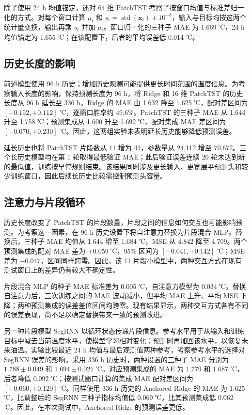 \documentclass[UTF8,a4paper,11pt,fontset=windows]{ctexart}
\begin{document}
除了使用 24 h 均值锚定，还对 64 维 PatchTST 考察了按窗口均值与标准差归一化的方式。对每个窗口计算 $\mu_t$ 和 $s_t=\operatorname{std}(\mathbf x_t)+10^{-8}$，输入与目标均按这两个统计量变换，输出再乘 $s_t$ 并加 $\mu_t$。窗口归一化的三种子 MAE 为 1.669 ℃，24 h 均值锚定为 1.655 ℃；在该配置下，后者的平均误差低 0.014 ℃。

\subsection{历史长度的影响}
前述模型使用 96 h 历史；增加历史观测可能提供更长时间范围的温度信息。为考察输入长度的影响，保持预测长度为 96 h，将 Ridge 和 16 维 PatchTST 的历史长度从 96 h 延长至 336 h。Ridge 的 MAE 由 1.632 降至 1.625 ℃，配对差区间为 $[-0.152,+0.112]$ ℃，逐窗口胜率约 49.6\%。PatchTST 的三种子 MAE 从 1.644 升至 1.758 ℃；预测集成从 1.600 升至 1.692 ℃，配对集成 MAE 差区间为 $[-0.070,+0.230]$ ℃。因此，这两组实验未表明延长历史能够降低预测误差。

延长历史也将 PatchTST 片段数从 11 增为 41，参数量从 24,112 增至 70,672。三个长历史模型均在第 1 轮取得最低验证 MAE；此后验证误差连续 20 轮未达到新的最低值，训练按早停规则结束。该结果同时涉及更长输入、更宽展平预测头和较少训练窗口，因此后续长历史比较需控制预测头容量。

\subsection{注意力与片段循环}
历史长度改变了 PatchTST 的片段数量，片段之间的信息如何交互也可能影响预测。为考察这一因素，在 96 h 历史设置下将自注意力替换为片段混合 MLP。替换后，三种子 MAE 均值从 1.644 增至 1.684 ℃，MSE 从 4.842 降至 4.709。两个预测集成的配对 MAE 差为 +0.059 ℃，95\% 区间为 $[-0.041,+0.142]$ ℃；MSE 差为 $-0.047$，区间同样跨零。因此，该 11 片段小模型中，两种交互方式在现有测试窗口上的差异仍有较大不确定性。

片段混合 MLP 的种子 MAE 标准差为 0.005 ℃，自注意力模型为 0.034 ℃。替换自注意力后，三次训练之间的 MAE 波动减小，但平均 MAE 上升、平均 MSE 下降；两种预测集成的误差差值区间均跨零。现有结果显示，两种交互方式各有不同的误差表现，尚不足以确定替换带来一致的预测改进。

另一种片段模型 SegRNN 以循环状态传递片段信息。参考水平用于从输入和训练目标中减去当前温度水平，使模型学习相对变化；预测时再加回该水平，以恢复未来油温。实验比较最近 24 h 均值与最后观测值两种参考，考察参考水平的选择对 SegRNN 误差的影响。采用 336 h 历史时，两种设置的三种子 MAE 分别为 $1.788\pm0.049$ 和 $1.694\pm0.021$ ℃。对应预测集成的 MAE 为 1.779 和 1.687 ℃，后者降低 0.092 ℃；按测试窗口计算的集成 MAE 配对差区间为 $[+0.060,+0.120]$ ℃。同样使用 336 h 历史的 Anchored Ridge 的 MAE 为 1.625 ℃，比调整后的 SegRNN 三种子指标均值低 0.069 ℃，比其预测集成低 0.062 ℃。因此，在本次测试中，Anchored Ridge 的预测误差更低。
\end{document}

